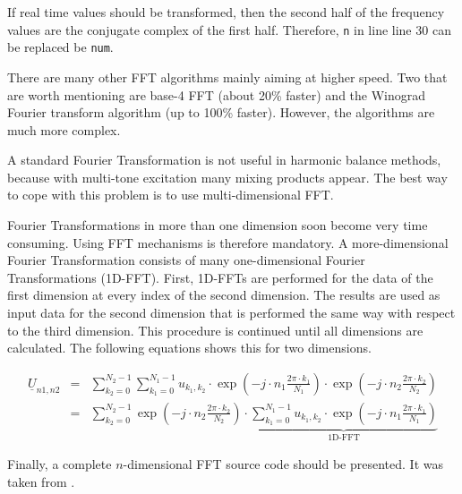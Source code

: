 \addvspace{12pt}

If real time values should be transformed, then the second half
of the frequency values are the conjugate complex of the first half.
Therefore, \texttt{n} in line line 30 can be replaced be \texttt{num}.

\addvspace{12pt}

There are many other FFT algorithms mainly aiming at higher speed.
Two that are worth mentioning are base-4 FFT (about 20\% faster)
and the Winograd Fourier transform algorithm (up to 100\% faster).
However, the algorithms are much more complex.

\addvspace{12pt}

A standard Fourier Transformation is not useful in harmonic balance
methods, because with multi-tone excitation many mixing products appear.
The best way to cope with this problem is to use multi-dimensional
FFT.

\addvspace{12pt}

Fourier Transformations in more than one dimension soon become
very time consuming. Using FFT mechanisms is therefore mandatory.
A more-dimensional Fourier Transformation consists of many
one-dimensional Fourier Transformations (1D-FFT). First, 1D-FFTs
are performed for the data of the first dimension at every index
of the second dimension. The results are used as input data for
the second dimension that is performed the same way with respect
to the third dimension. This procedure is continued until all
dimensions are calculated. The following equations shows this
for two dimensions.

\begin{eqnarray}
\underline{U}_{n1,n2} & = & \sum_{k_2=0}^{N_2-1} \sum_{k_1=0}^{N_1-1}
   u_{k_1,k_2}\cdot \exp\left( -j\cdot n_1\frac{2\pi\cdot k_1}{N_1} \right)
              \cdot \exp\left( -j\cdot n_2\frac{2\pi\cdot k_2}{N_2} \right) \\
 & = & \sum_{k_2=0}^{N_2-1} \exp\left( -j\cdot n_2\frac{2\pi\cdot k_2}{N_2} \right)
       \cdot \underbrace{ \sum_{k_1=0}^{N_1-1}
   u_{k_1,k_2}\cdot \exp\left( -j\cdot n_1\frac{2\pi\cdot k_1}{N_1} \right) }_\text{1D-FFT}
\end{eqnarray}


Finally, a complete $n$-dimensional FFT source code should be
presented. It was taken from \cite{Press}.

\addvspace{12pt}

